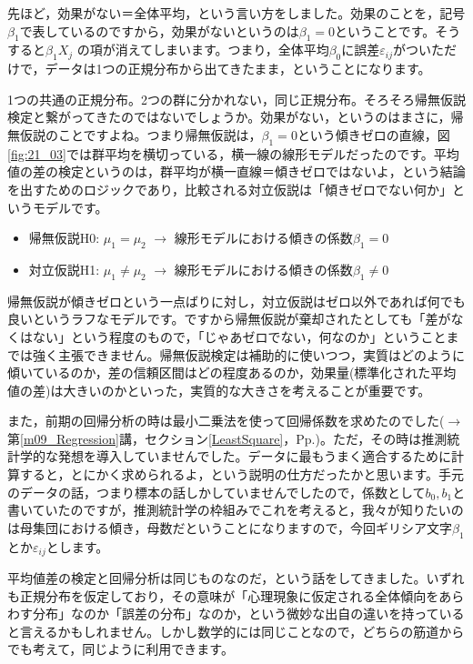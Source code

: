 \documentclass{ltjbook}
\begin{document}
先ほど，効果がない＝全体平均，という言い方をしました。効果のことを，記号$\beta_1$で表しているのですから，効果がないというのは$\beta_1=0$ということです。そうすると$\beta_1X_j$ の項が消えてしまいます。つまり，全体平均$\beta_0$に誤差$\varepsilon_{ij}$がついただけで，データは1つの正規分布から出てきたまま，ということになります。

1つの共通の正規分布。2つの群に分かれない，同じ正規分布。そろそろ帰無仮説検定と繋がってきたのではないでしょうか。効果がない，というのはまさに，帰無仮説のことですよね。つまり帰無仮説は，$\beta_1=0$という傾きゼロの直線，図\ref{fig:21_03}では群平均を横切っている，横一線の線形モデルだったのです。平均値の差の検定というのは，群平均が横一直線＝傾きゼロではないよ，という結論を出すためのロジックであり，比較される対立仮説は「傾きゼロでない何か」というモデルです。
\begin{itemize}
	\item 帰無仮説H0: $\mu_1 = \mu_2$ $\to$ 線形モデルにおける傾きの係数$\beta_1=0$
	\item 対立仮説H1: $\mu_1 \neq \mu_2$ $\to$ 線形モデルにおける傾きの係数$\beta_1\neq 0$
\end{itemize}
帰無仮説が傾きゼロという一点ばりに対し，対立仮説はゼロ以外であれば何でも良いというラフなモデルです。ですから帰無仮説が棄却されたとしても「差がなくはない」という程度のもので，「じゃあゼロでない，何なのか」ということまでは強く主張できません。帰無仮説検定は補助的に使いつつ，実質はどのように傾いているのか，差の信頼区間はどの程度あるのか，効果量(標準化された平均値の差)は大きいのかといった，実質的な大きさを考えることが重要です。

また，前期の回帰分析の時は最小二乗法を使って回帰係数を求めたのでした($\to$第\ref{m09_Regression}講，セクション\ref{LeastSquare}，Pp.\pageref{LeastSquare})。ただ，その時は推測統計学的な発想を導入していませんでした。データに最もうまく適合するために計算すると，とにかく求められるよ，という説明の仕方だったかと思います。手元のデータの話，つまり標本の話しかしていませんでしたので，係数として$b_0,b_1$と書いていたのですが，推測統計学の枠組みでこれを考えると，我々が知りたいのは母集団における傾き，母数だということになりますので，今回ギリシア文字$\beta_1$とか$\varepsilon_{ij}$とします。

平均値差の検定と回帰分析は同じものなのだ，という話をしてきました。いずれも正規分布を仮定しており，その意味が「心理現象に仮定される全体傾向をあらわす分布」なのか「誤差の分布」なのか，という微妙な出自の違いを持っていると言えるかもしれません。しかし数学的には同じことなので，どちらの筋道からでも考えて，同じように利用できます。
\end{document}
